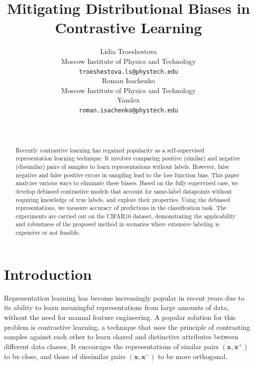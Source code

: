 \documentclass{article}
\title{Mitigating Distributional Biases in Contrastive Learning}
\author{ Lidia Troeshestova \\
	Moscow Institute of Physics and Technology\\
	\texttt{troeshestova.ls@phystech.edu} \\
	\And
        Roman Isachenko\\
        Moscow Institute of Physics and Technology\\
        Yandex\\
	\texttt{roman.isachenko@phystech.edu} \\
	   \\
	\texttt{} \\
}
\date{}
\begin{document}
\nocite{*}
\maketitle

\begin{abstract}

Recently contrastive learning has regained popularity as a self-supervised representation learning technique. It involves comparing positive (similar) and negative (dissimilar) pairs of samples to learn representations without labels. However, false negative and false positive errors in sampling lead to the loss function bias. This paper analyzes various ways to eliminate these biases. Based on the fully-supervised case, we develop debiased contrastive models that account for same-label datapoints without requiring knowledge of true labels, and explore their properties. Using the debiased representations, we measure accuracy of predictions in the classification task. The experiments are carried out on the CIFAR10 dataset, demonstrating the applicability and robustness of the proposed method in scenarios where extensive labeling is expensive or not feasible.
\end{abstract}



\section{Introduction}
Representation learning has become increasingly popular in recent years due to its ability to learn meaningful representations from large amounts of data, without the need for manual feature engineering. A popular solution for this problem is contrastive learning, a technique that uses the principle of contrasting samples against each other to learn shared and distinctive attributes between different data classes. It encourages the representations of similar pairs $(\textbf{x}, \textbf{x}^+)$ to be close, and those of dissimilar pairs $(\textbf{x}, \textbf{x}^-)$ to be more orthogonal.
\end{document}
